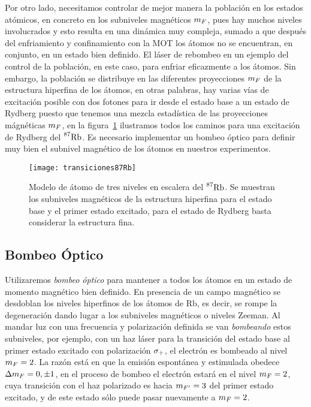 \p Por otro lado, necesitamos controlar de mejor manera la población en los estados atómicos, en concreto en los subniveles magnéticos $m_{F}$, pues hay muchos niveles involucrados y esto resulta en una dinámica muy compleja, sumado a que después del enfriamiento y confinamiento con la MOT los átomos no se encuentran, en conjunto, en un estado bien definido. El láser de rebombeo en un ejemplo del control de la población, en este caso, para enfriar eficazmente a los átomos. Sin embargo, la población se distribuye en las diferentes proyecciones $m_{F}$ de la estructura hiperfina de los átomos, en otras palabras, hay varias vías de excitación posible con dos fotones para ir desde el estado base a un estado de Rydberg puesto que tenemos una mezcla estadística de las proyecciones mágnéticas $m_{F}$, en la figura~\ref{fig:transiciones87Rb} ilustramos todos los caminos para una excitación de Rydberg del $\prescript{87}{}{\mathrm{Rb}}$. Es necesario implementar un bombeo óptico para definir muy bien el subnivel magnético de los átomos en nuestros experimentos.

\begin{figure}[H]
\centering
\begin{minipage}{0.8\textwidth}
\centering
\texttt{[image: transiciones87Rb]}
\caption{\label{fig:transiciones87Rb}Modelo de átomo de tres niveles en escalera del $\prescript{87}{}{\mathrm{Rb}}$. Se muestran los subniveles magnéticos de la estructura hiperfina para el estado base y el primer estado excitado, para el estado de Rydberg basta considerar la estructura fina.}
\end{minipage}
\end{figure}

\subsection{\label{sub:bombeoOptico}Bombeo Óptico}
 
Utilizaremos \emph{bombeo óptico} para mantener a todos los átomos en un estado de momento magnético bien definido. En presencia de un campo magnético se desdoblan los niveles hiperfinos de los átomos de Rb, es decir, se rompe la degeneración dando lugar a los subniveles magnéticos o niveles Zeeman. Al mandar luz con una frecuencia y polarización definida se van \emph{bombeando} estos subniveles, por ejemplo, con un haz láser para la transición del estado base al primer estado excitado con polarización $\sigma_{+}$, el electrón es bombeado al nivel $m_{F}=2$. La razón está en que la emisión espontánea y estimulada obedece $\Delta m_{F}=0,\pm1$, en el proceso de bombeo el electrón estará en el nivel $m_{F}=2$, cuya transición con el haz polarizado es hacia $m_{F'}=3$ del primer estado excitado, y de este estado sólo puede pasar nuevamente a $m_{F}=2$.

